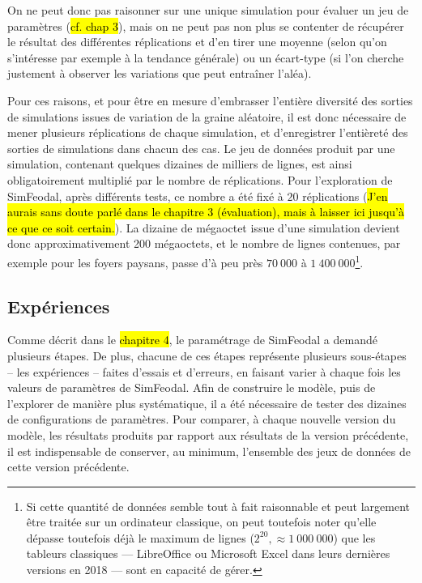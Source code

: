 	On ne peut donc pas raisonner sur une unique simulation pour évaluer un jeu de paramètres (\hl{cf. chap 3}), mais on ne peut pas non plus se contenter de récupérer le résultat des différentes réplications et d'en tirer une moyenne (selon qu'on s'intéresse par exemple à la tendance générale) ou un écart-type (si l'on cherche justement à observer les variations que peut entraîner l'aléa).

	Pour ces raisons, et pour être en mesure d'embrasser l'entière diversité des sorties de simulations issues de variation de la graine aléatoire, il est donc nécessaire de mener plusieurs réplications de chaque simulation, et d'enregistrer l'entièreté des sorties de simulations dans chacun des cas.
	Le jeu de données produit par une simulation, contenant quelques dizaines de milliers de lignes, est ainsi obligatoirement multiplié par le nombre de réplications.
	Pour l'exploration de SimFeodal, après différents tests, ce nombre a été fixé à $20$ réplications (\hl{J'en aurais sans doute parlé dans le chapitre 3 (évaluation), mais à laisser ici jusqu'à ce que ce soit certain.}).
	La dizaine de mégaoctet issue d'une simulation devient donc approximativement 200 mégaoctets, et le nombre de lignes contenues, par exemple pour les foyers paysans, passe d'à peu près $70~000$ à $1~400~000$\footnote{
	Si cette quantité de données semble tout à fait raisonnable et peut largement être traitée sur un ordinateur classique, on peut toutefois noter qu'elle dépasse toutefois déjà le maximum de lignes ($2^{20}, \approx 1~000~000$) que les tableurs classiques ---
	LibreOffice ou Microsoft Excel dans leurs dernières versions en 2018
	--- sont en capacité de gérer.
	}.

	\subsection{Expériences}\label{subsec:capter-experiences}

	Comme décrit dans le \hl{chapitre 4}, le paramétrage de SimFeodal a demandé plusieurs étapes.
	De plus, chacune de ces étapes représente plusieurs sous-étapes -- les expériences -- faites d'essais et d'erreurs, en faisant varier à chaque fois les valeurs de paramètres de SimFeodal.
	Afin de construire le modèle, puis de l'explorer de manière plus systématique, il a été nécessaire de tester des dizaines de configurations de paramètres.
	Pour comparer, à chaque nouvelle version du modèle, les résultats produits par rapport aux résultats de la version précédente, il est indispensable de conserver, au minimum, l'ensemble des jeux de données de cette version précédente.

